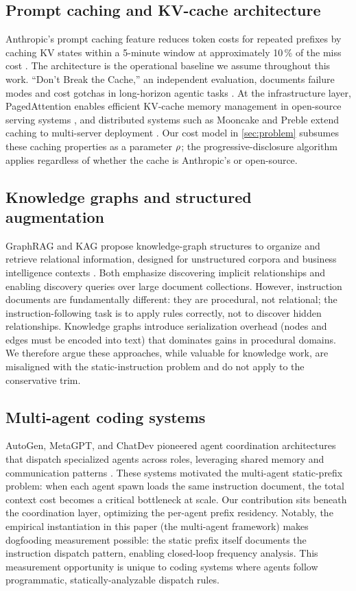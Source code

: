 \subsection{Prompt caching and KV-cache architecture}

Anthropic's prompt caching feature reduces token costs for repeated prefixes by
caching KV states within a 5-minute window at approximately 10\,\% of the miss
cost \cite{anthropic-cache}. The architecture is the operational baseline we
assume throughout this work. ``Don't Break the Cache,'' an independent
evaluation, documents failure modes and cost gotchas in long-horizon agentic
tasks \cite{dont-break-cache}. At the infrastructure layer, PagedAttention
enables efficient KV-cache memory management in open-source serving systems
\cite{pagedattention}, and distributed systems such as Mooncake and Preble
extend caching to multi-server deployment \cite{mooncake,preble}. Our cost
model in \cref{sec:problem} subsumes these caching properties as a parameter
$\rho$; the progressive-disclosure algorithm applies regardless of whether
the cache is Anthropic's or open-source.

\subsection{Knowledge graphs and structured augmentation}

GraphRAG and KAG propose knowledge-graph structures to organize and retrieve
relational information, designed for unstructured corpora and business
intelligence contexts \cite{graphrag,kag}. Both emphasize discovering implicit
relationships and enabling discovery queries over large document collections.
However, instruction documents are fundamentally different: they are procedural,
not relational; the instruction-following task is to apply rules correctly, not
to discover hidden relationships. Knowledge graphs introduce serialization
overhead (nodes and edges must be encoded into text) that dominates gains in
procedural domains. We therefore argue these approaches, while valuable for
knowledge work, are misaligned with the static-instruction problem and do not
apply to the conservative trim.

\subsection{Multi-agent coding systems}

AutoGen, MetaGPT, and ChatDev pioneered agent coordination architectures that
dispatch specialized agents across roles, leveraging shared memory and
communication patterns \cite{autogen,metagpt}. These systems motivated the
multi-agent static-prefix problem: when each agent spawn loads the same
instruction document, the total context cost becomes a critical bottleneck at
scale. Our contribution sits beneath the coordination layer, optimizing the
per-agent prefix residency. Notably, the empirical instantiation in this paper
(the \blackrim multi-agent framework) makes dogfooding measurement possible:
the static prefix itself documents the instruction dispatch pattern, enabling
closed-loop frequency analysis. This measurement opportunity is unique to coding
systems where agents follow programmatic, statically-analyzable dispatch rules.

